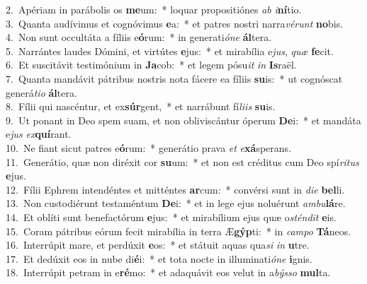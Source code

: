 {2.~}Apériam in parábolis os \textbf{me}um:~* loquar propositiónes \textit{ab} \textit{i}\textbf{ní}tio.\\
{3.~}Quanta audívimus et cognóvimus \textbf{e}a:~* et patres nostri narra\textit{vé}\textit{runt} \textbf{no}bis.\\
{4.~}Non sunt occultáta a fíliis e\textbf{ó}rum:~* in generati\textit{ó}\textit{ne} \textbf{ál}tera.\\
{5.~}Narrántes laudes Dómini, et virtútes \textbf{e}jus:~* et mirabília e\textit{jus}, \textit{quæ} \textbf{fe}cit.\\
{6.~}Et suscitávit testimónium in \textbf{Ja}cob:~* et legem pósu\textit{it} \textit{in} \textbf{Is}raël.\\
{7.~}Quanta mandávit pátribus nostris nota fácere ea fíliis \textbf{su}is:~* ut cognóscat generá\textit{ti}\textit{o} \textbf{ál}tera.\\
{8.~}Fílii qui nascéntur, et ex\textbf{súr}gent,~* et narrábunt fí\textit{li}\textit{is} \textbf{su}is.\\
{9.~}Ut ponant in Deo spem suam, et non obliviscántur óperum \textbf{De}i:~* et mandáta e\textit{jus} \textit{ex}\textbf{quí}rant.\\
{10.~}Ne fiant sicut patres e\textbf{ó}rum:~* generátio prava \textit{et} \textit{e}\textbf{xá}sperans.\\
{11.~}Generátio, quæ non diréxit cor \textbf{su}um:~* et non est créditus cum Deo spí\textit{ri}\textit{tus} \textbf{e}jus.\\
{12.~}Fílii Ephrem intendéntes et mitténtes \textbf{ar}cum:~* convérsi sunt in \textit{di}\textit{e} \textbf{bel}li.\\
{13.~}Non custodiérunt testaméntum \textbf{De}i:~* et in lege ejus noluérunt \textit{am}\textit{bu}\textbf{lá}re.\\
{14.~}Et oblíti sunt benefactórum \textbf{e}jus:~* et mirabílium ejus quæ o\textit{stén}\textit{dit} \textbf{e}is.\\
{15.~}Coram pátribus eórum fecit mirabília in terra Æ\textbf{gýp}ti:~* in \textit{cam}\textit{po} \textbf{Tá}neos.\\
{16.~}Interrúpit mare, et perdúxit \textbf{e}os:~* et státuit aquas qua\textit{si} \textit{in} \textbf{u}tre.\\
{17.~}Et dedúxit eos in nube di\textbf{é}i:~* et tota nocte in illuminati\textit{ó}\textit{ne} \textbf{i}gnis.\\
{18.~}Interrúpit petram in e\textbf{ré}mo:~* et adaquávit eos velut in a\textit{býs}\textit{so} \textbf{mul}ta.\\
